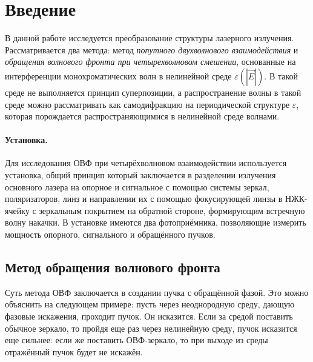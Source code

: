 \documentclass[a5paper,11pt]{extarticle}
\begin{document}


\tableofcontents
\newpage



\section*{Введение}
\vspace{-0.5em}
В данной работе исследуется преобразование структуры лазерного излучения. Рассматривается два метода: метод \textit{попутного двухволнового взаимодействия} и \textit{обращения волнового фронта при четырехволновом смешении}, основанные на интерференции монохроматических волн в нелинейной среде $\varepsilon(|\vec{E}|)$. В такой среде не выполняется принцип суперпозиции, а распространение волны в такой среде можно рассматривать как самодифракцию на периодической структуре $\varepsilon$, которая порождается распространяющимися в нелинейной среде волнами.



\vspace{-0.5em}

\paragraph{Установка.} Для исследования ОВФ при четырёхволновом взаимодействии используется установка, общий принцип который заключается в разделении излучения основного лазера на опорное и сигнальное с помощью системы зеркал, поляризаторов, линз и направлении их с помощью фокусирующей линзы в НЖК-ячейку с зеркальным покрытием на обратной стороне, формирующим встречную волну накачки. В установке имеются два фотоприёмника, позволяющие измерить мощность опорного, сигнального и обращённого пучков. 

\newpage


\subsection{Метод обращения волнового фронта}
Суть метода ОВФ заключается в создании пучка с обращённой фазой. Это можно объяснить на следующем примере: пусть через неоднородную среду, дающую фазовые искажения, проходит пучок. Он исказится. Если за средой поставить обычное зеркало, то пройдя еще раз через нелинейную среду, пучок исказится еще сильнее: если же поставить ОВФ-зеркало, то при выходе из среды отражённый пучок будет не искажён. 
\end{document}
